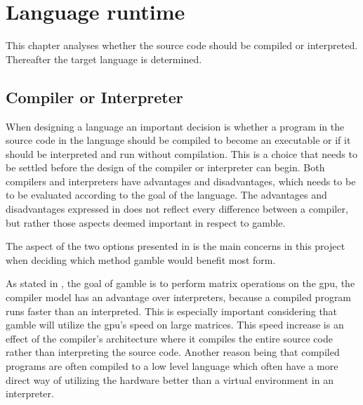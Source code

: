 \chapter{Language runtime}
This chapter analyses whether the source code should be compiled or interpreted.
Thereafter the target language is determined. 

\section{Compiler or Interpreter}
When designing a language an important decision is whether a program in the source code in the language should be compiled to become an executable or if it should be interpreted and run without compilation.
This is a choice that needs to be settled before the design of the compiler or interpreter can begin.
Both compilers and interpreters have advantages and disadvantages, which needs to be to be evaluated according to the goal of the language.
The advantages and disadvantages expressed in  does not reflect every difference between a compiler, but rather those aspects deemed important in respect to \gls{gamble}.



The aspect of the two options presented in  is the main concerns in this project when deciding which method \gls{gamble} would benefit most form.

As stated in , the goal of \gls{gamble} is to perform matrix operations on the \acrshort{gpu}, the compiler model has an advantage over interpreters, because a compiled program runs faster than an interpreted. 
This is especially important considering that \gls{gamble} will utilize the \acrshort{gpu}'s speed on large matrices. 
This speed increase is an effect of the compiler's architecture where it compiles the entire source code rather than interpreting  the source code. 
Another reason being that compiled programs are often compiled to a low level language which often have a more direct way of utilizing the hardware better than a virtual environment in an interpreter.

